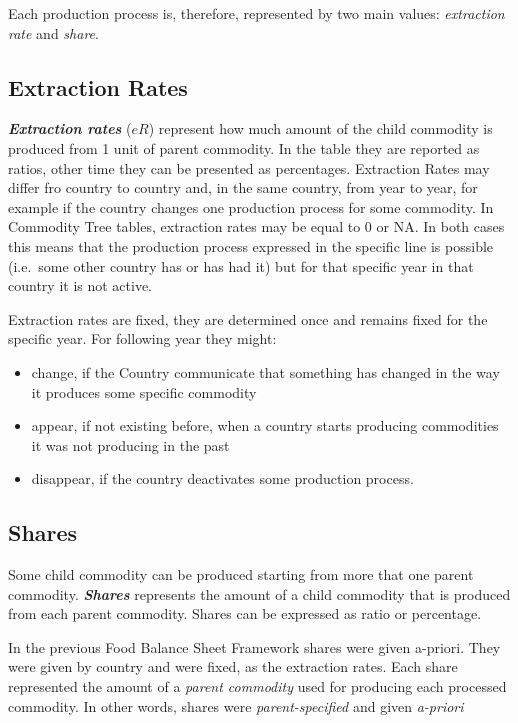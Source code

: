 \documentclass[]{article}
\providecommand{\tightlist}{%
  \setlength{\itemsep}{0pt}\setlength{\parskip}{0pt}}
\begin{document}
Each production process is, therefore, represented by two main values:
\emph{extraction rate} and \emph{share}.

\subsection{Extraction Rates}\label{extraction-rates}

\textbf{\emph{Extraction rates}} (\(eR\)) represent how much amount of
the child commodity is produced from 1 unit of parent commodity. In the
table they are reported as ratios, other time they can be presented as
percentages. Extraction Rates may differ fro country to country and, in
the same country, from year to year, for example if the country changes
one production process for some commodity. In Commodity Tree tables,
extraction rates may be equal to 0 or NA. In both cases this means that
the production process expressed in the specific line is possible
(i.e.~some other country has or has had it) but for that specific year
in that country it is not active.

Extraction rates are fixed, they are determined once and remains fixed
for the specific year. For following year they might:

\begin{itemize}
\tightlist
\item
  change, if the Country communicate that something has changed in the
  way it produces some specific commodity
\item
  appear, if not existing before, when a country starts producing
  commodities it was not producing in the past
\item
  disappear, if the country deactivates some production process.
\end{itemize}

\subsection{Shares}\label{shares}

Some child commodity can be produced starting from more that one parent
commodity. \textbf{\emph{Shares }} represents the amount of a child
commodity that is produced from each parent commodity. Shares can be
expressed as ratio or percentage.

In the previous Food Balance Sheet Framework shares were given a-priori.
They were given by country and were fixed, as the extraction rates. Each
share represented the amount of a \emph{parent commodity} used for
producing each processed commodity. In other words, shares were
\emph{parent-specified} and given \emph{a-priori}
\end{document}
